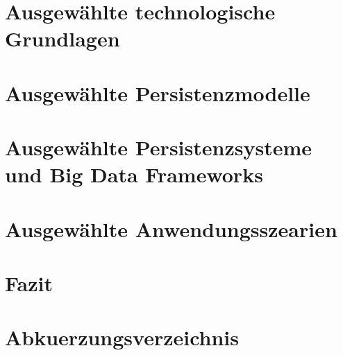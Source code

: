 \documentclass[12pt, bibliography=totoc, a4paper, abstractoff, numbers=noenddot]{scrreprt}
\begin{document}









\chapter{Ausgewählte technologische Grundlagen}

\chapter{Ausgewählte Persistenzmodelle}
%
\chapter[Ausgewählte Persistenzsysteme]{Ausgewählte Persistenzsysteme und Big Data Frameworks}

\newpage

\chapter{Ausgewählte Anwendungsszearien}

\chapter{Fazit}




\newpage

%




\newpage
{}
\listoffigures
\newpage
{}
\listoftables
\newpage
{}
\lstlistoflistings


{}
\renewcommand\refname{Abkuerzungsverzeichnis} 
\chapter*{Abkuerzungsverzeichnis}

\newpage




%
\end{document}
